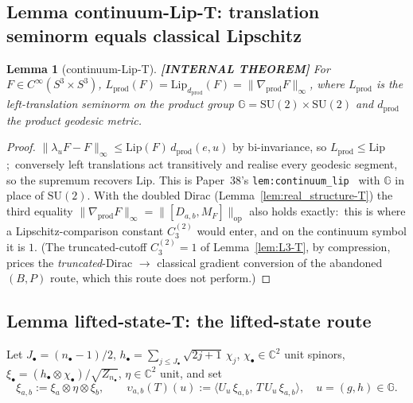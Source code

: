 \documentclass[11pt,a4paper]{article}
\theoremstyle{plain}
\newtheorem{lemma}[theorem]{Lemma}
\theoremstyle{definition}
\newcommand{\sthree}{S^{3}}
\newcommand{\opnorm}[1]{\lVert #1 \rVert_{\mathrm{op}}}
\newcommand{\norm}[1]{\lVert #1 \rVert}
\newcommand{\C}{\mathbb{C}}
\newcommand{\SU}{\mathrm{SU}}
\newcommand{\Mat}{M}
\begin{document}
\subsection{Lemma continuum-Lip-T: translation seminorm equals classical
Lipschitz}\label{sec:continuum_lip-T}

\begin{lemma}[continuum-Lip-T]\label{lem:continuum_lip-T}
\textbf{[INTERNAL THEOREM]} For $F \in C^\infty(\sthree \times \sthree)$,
$L_{\mathrm{prod}}(F) = \mathrm{Lip}_{d_{\mathrm{prod}}}(F) =
\norm{\nabla_{\mathrm{prod}} F}_\infty$, where $L_{\mathrm{prod}}$ is the
left-translation seminorm on the product group
$\mathbb{G} = \SU(2)\times\SU(2)$ and $d_{\mathrm{prod}}$ the product
geodesic metric.
\end{lemma}

\begin{proof}
$\norm{\lambda_u F - F}_\infty \le \mathrm{Lip}(F)\, d_{\mathrm{prod}}(e,u)$
by bi-invariance, so $L_{\mathrm{prod}} \le \mathrm{Lip}$;\ conversely left
translations act transitively and realise every geodesic segment, so the
supremum recovers $\mathrm{Lip}$. This is Paper~38's
\texttt{lem:continuum\_lip}~\cite{loutey_paper38} with $\mathbb{G}$ in place
of $\SU(2)$. With the doubled Dirac (Lemma~\ref{lem:real_structure-T}) the
third equality $\norm{\nabla_{\mathrm{prod}}F}_\infty =
\opnorm{[D_{a,b}, \Mat_F]}$ also holds exactly:\ this is where a
Lipschitz-comparison constant $C_3^{(2)}$ would enter, and on the continuum
symbol it is $1$. (The truncated-cutoff $C_3^{(2)} = 1$ of
Lemma~\ref{lem:L3-T}, by compression, prices the \emph{truncated}-Dirac $\to$ classical
gradient conversion of the abandoned $(B,P)$ route, which this route does not
perform.)
\end{proof}

\subsection{Lemma lifted-state-T: the lifted-state route}\label{sec:lifted_state-T}

Let $J_\bullet = (n_\bullet - 1)/2$,
$h_\bullet = \sum_{j \le J_\bullet} \sqrt{2j+1}\,\chi_j$,
$\chi_\bullet \in \C^2$ unit spinors, $\xi_\bullet =
(h_\bullet \otimes \chi_\bullet)/\sqrt{Z_{n_\bullet}}$, $\eta \in \C^2$
unit, and set
\begin{equation}\label{eq:lifted_state_def-T}
   \xi_{a,b} := \xi_a \otimes \eta \otimes \xi_b, \qquad
   \upsilon_{a,b}(T)(u) := \langle U_u\,\xi_{a,b},\, T\,U_u\,\xi_{a,b}\rangle,
   \quad u = (g,h) \in \mathbb{G}.
\end{equation}
\end{document}
